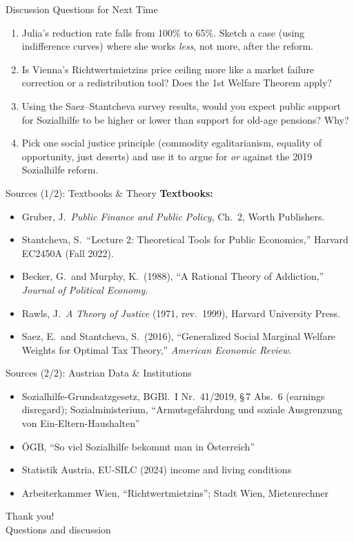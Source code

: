\documentclass[11pt,aspectratio=169]{beamer}
\begin{document}
\begin{frame}{Discussion Questions for Next Time}
  \begin{enumerate}
    \item Julia's reduction rate falls from 100\% to 65\%. Sketch a case (using indifference curves) where she works \emph{less}, not more, after the reform.
    \item Is Vienna's Richtwertmietzins price ceiling more like a market failure correction or a redistribution tool? Does the 1st Welfare Theorem apply?
    \item Using the Saez--Stantcheva survey results, would you expect public support for Sozialhilfe to be higher or lower than support for old-age pensions? Why?
    \item Pick one social justice principle (commodity egalitarianism, equality of opportunity, just deserts) and use it to argue for \emph{or} against the 2019 Sozialhilfe reform.
  \end{enumerate}
\end{frame}

\begin{frame}{Sources (1/2): Textbooks \& Theory}
  \footnotesize
  \textbf{Textbooks:}
  \begin{itemize}
  \setlength{\itemsep}{2pt}
    \item Gruber, J.\ \emph{Public Finance and Public Policy}, Ch.\ 2, Worth Publishers.
    \item Stantcheva, S.\ ``Lecture 2: Theoretical Tools for Public Economics,'' Harvard EC2450A (Fall 2022).
    \item Becker, G.\ and Murphy, K.\ (1988), ``A Rational Theory of Addiction,'' \emph{Journal of Political Economy}.
    \item Rawls, J.\ \emph{A Theory of Justice} (1971, rev.\ 1999), Harvard University Press.
    \item Saez, E.\ and Stantcheva, S.\ (2016), ``Generalized Social Marginal Welfare Weights for Optimal Tax Theory,'' \emph{American Economic Review}.
  \end{itemize}
\end{frame}

\begin{frame}{Sources (2/2): Austrian Data \& Institutions}
  \footnotesize
  \begin{itemize}
  \setlength{\itemsep}{2pt}
    \item Sozialhilfe-Grundsatzgesetz, BGBl.\ I Nr.\ 41/2019, \S\,7 Abs.\ 6 (earnings disregard); Sozialministerium, ``Armutsgefährdung und soziale Ausgrenzung von Ein-Eltern-Haushalten''
    \item ÖGB, ``So viel Sozialhilfe bekommt man in Österreich''
    \item Statistik Austria, EU-SILC (2024) income and living conditions
    \item Arbeiterkammer Wien, ``Richtwertmietzins''; Stadt Wien, Mietenrechner
  \end{itemize}
\end{frame}

\begin{frame}[standout]
  Thank you!\\
  \vspace{0.5em}
  \small Questions and discussion
\end{frame}
\end{document}
